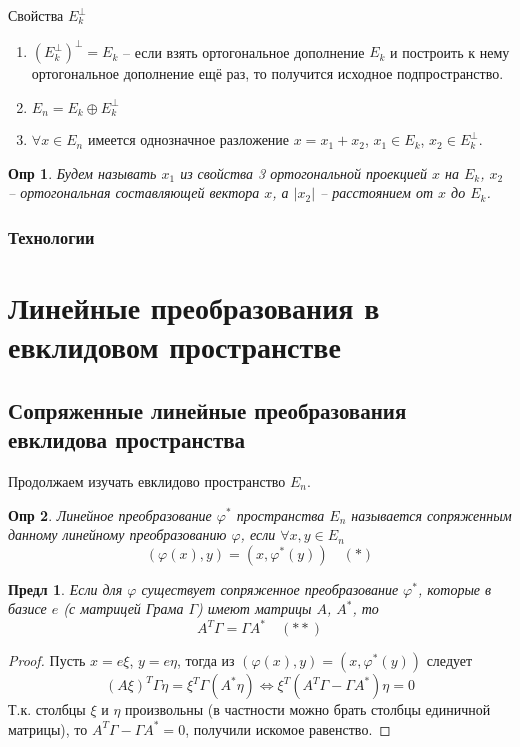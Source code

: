 \documentclass[a4paper,12pt]{article}
\newtheorem*{definition}{Опр}
\newtheorem{propos}{Предл}[section]
\begin{document}
Свойства $E_k^{\perp}$

\begin{enumerate}
	\item $(E_k^{\perp})^{\perp} = E_k$ -- если взять ортогональное дополнение $E_k$ и построить к нему ортогональное дополнение ещё раз, то получится исходное подпространство.
	\item $E_n = E_k \oplus E_k^{\perp}$
	\item $\forall x \in E_n$ имеется однозначное разложение $x = x_1 + x_2$, $x_1 \in E_k$, $x_2 \in E_k^{\perp}$.
\end{enumerate}

\begin{definition}
	Будем называть $x_1$ из свойства 3 ортогональной проекцией $x$ на $E_k$, $x_2$ -- ортогональная составляющей вектора $x$, а $|x_2|$ -- расстоянием от $x$ до $E_k$.
\end{definition}

\subsubsection{Технологии}

\section{Линейные преобразования в евклидовом пространстве}
\subsection{Сопряженные линейные преобразования евклидова пространства}
Продолжаем изучать евклидово пространство $E_n$.

\begin{definition}
	Линейное преобразование $\varphi^*$ пространства $E_n$ называется сопряженным данному линейному преобразованию $\varphi$, если $\forall x, y \in E_n$
	\[
		(\varphi(x), y) = (x, \varphi^*(y)) \quad (*)
	\]
\end{definition}

\begin{propos}
	Если для $\varphi$ существует сопряженное преобразование $\varphi^*$, которые в базисе $e$ (с матрицей Грама $\Gamma$) имеют матрицы $A$, $A^*$, то 
	\[
		A^T \Gamma = \Gamma A^* \quad (**)
	\]
\end{propos}
\begin{proof}
	Пусть $x = e\xi$, $y = e\eta$, тогда из $(\varphi(x),y) = (x, \varphi^*(y))$ следует 
	\[
		(A\xi)^T \Gamma \eta = \xi^T \Gamma (A^* \eta) \Leftrightarrow \xi^T (A^T \Gamma - \Gamma A^*) \eta = 0
	\]
	Т.к. столбцы $\xi$ и $\eta$ произвольны (в частности можно брать столбцы единичной матрицы), то $A^T \Gamma - \Gamma A^* = 0$, получили искомое равенство.
\end{proof}
\end{document}
